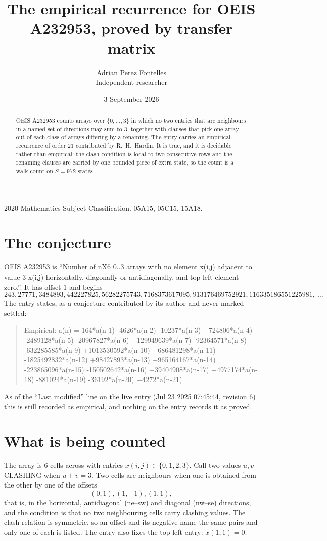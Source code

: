 \documentclass[11pt,a4paper]{article}
\title{The empirical recurrence for OEIS A232953, proved by transfer matrix}
\author{Adrian Perez Fontelles\\ \small Independent researcher}
\date{3 September 2026}
\theoremstyle{plain}
\theoremstyle{definition}
\begin{document}
\maketitle

\begin{abstract}
OEIS A232953 counts arrays over $\{0,\dots,3\}$ in which no two entries that are neighbours in
a named set of directions may sum to $3$, together with clauses that pick one array out of
each class of arrays differing by a renaming. The entry carries an empirical recurrence of
order $21$ contributed by R.~H.~Hardin. It is true, and it is decidable rather than
empirical: the clash condition is local to two consecutive rows and the renaming clauses are
carried by one bounded piece of extra state, so the count is a walk count on $S=972$ states.
\end{abstract}

\noindent\small 2020 Mathematics Subject Classification. 05A15, 05C15, 15A18.\normalsize

\section{The conjecture}

OEIS A232953 is ``Number of nX6 0..3 arrays with no element x(i,j) adjacent to value 3-x(i,j) horizontally, diagonally or antidiagonally, and top left element zero.''. It has offset $1$ and begins
\[
243, 27771, 3484893, 442227825, 56282275743, 7168373617095, 913176469752921, 116335186551225981,\ \dots
\]
The entry states, as a conjecture contributed by its author and never marked settled:
\begin{quote}
Empirical: a(n) = 164*a(n-1) -4626*a(n-2) -10237*a(n-3) +724806*a(n-4) -2489128*a(n-5) -20967827*a(n-6) +129949639*a(n-7) -92364571*a(n-8) -632285585*a(n-9) +1013530592*a(n-10) +686481298*a(n-11) -1825492832*a(n-12) +98427893*a(n-13) +965164167*a(n-14) -223865096*a(n-15) -150502642*a(n-16) +39404908*a(n-17) +4977174*a(n-18) -881024*a(n-19) -36192*a(n-20) +4272*a(n-21)
\end{quote}
As of the ``Last modified'' line on the live entry (Jul 23 2025 07:45:44, revision 6) this is still
recorded as empirical, and nothing on the entry records it as proved.

\section{What is being counted}

The array is $6$ cells across with entries $x(i,j)\in\{0,1,2,3\}$. Call two values $u,v$ CLASHING
when $u+v=3$. Two cells are neighbours when one is obtained from the other by one of
the offsets
\[
(0,1), (1,-1), (1,1),
\]
that is, in the horizontal, antidiagonal (ne--sw) and diagonal (nw--se) directions, and the condition is that no two neighbouring cells carry
clashing values. The clash relation is symmetric, so an offset and its negative name the
same pairs and only one of each is listed. The entry also fixes the top left entry: $x(1,1)=0$.
\end{document}
